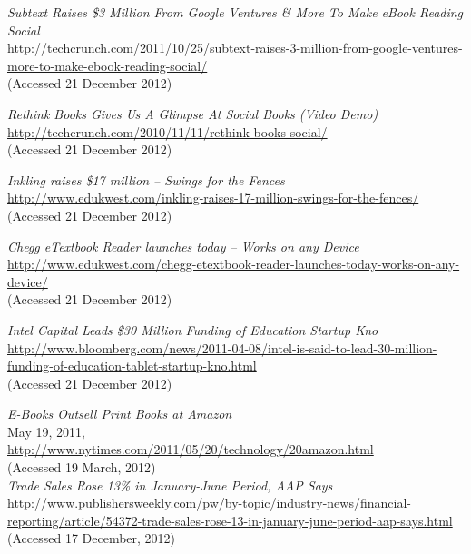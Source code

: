 \documentclass[a4paper,10pt]{book}
\begin{document}
\begin{thebibliography}{9}
 \emph{Subtext Raises \$3 Million From Google Ventures \& More To Make eBook Reading Social}\\
 \url{http://techcrunch.com/2011/10/25/subtext-raises-3-million-from-google-ventures-more-to-make-ebook-reading-social/}\\
   (Accessed 21 December 2012)
 
  \emph{Rethink Books Gives Us A Glimpse At Social Books (Video Demo)}\\
  \url{http://techcrunch.com/2010/11/11/rethink-books-social/}\\
  (Accessed 21 December 2012)
  
   \emph{Inkling raises \$17 million – Swings for the Fences}\\
   \url{http://www.edukwest.com/inkling-raises-17-million-swings-for-the-fences/}\\
 (Accessed 21 December 2012)
 
   \emph{Chegg eTextbook Reader launches today – Works on any Device}\\
   \url{http://www.edukwest.com/chegg-etextbook-reader-launches-today-works-on-any-device/}\\
 (Accessed 21 December 2012)
 
   \emph{Intel Capital Leads \$30 Million Funding of Education Startup Kno}\\
   \url{http://www.bloomberg.com/news/2011-04-08/intel-is-said-to-lead-30-million-funding-of-education-tablet-startup-kno.html}\\
  (Accessed 21 December 2012)
   
  \emph{E-Books Outsell Print Books at Amazon}\\ 
  May 19, 2011,\\
  \url{http://www.nytimes.com/2011/05/20/technology/20amazon.html}\\
  (Accessed 19 March, 2012)\\

   \emph{Trade Sales Rose 13\% in January-June Period, AAP Says } \\
  \url{http://www.publishersweekly.com/pw/by-topic/industry-news/financial-reporting/article/54372-trade-sales-rose-13-in-january-june-period-aap-says.html}\\
  (Accessed 17 December, 2012)\\
  

\end{thebibliography}
\end{document}
